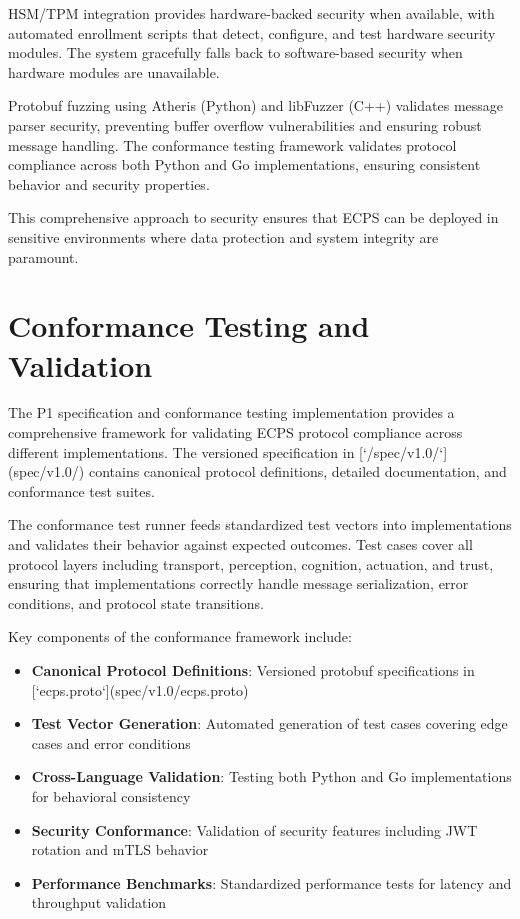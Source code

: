 \documentclass[12pt]{article}
\begin{document}
HSM/TPM integration provides hardware-backed security when available, with automated enrollment scripts that detect, configure, and test hardware security modules. The system gracefully falls back to software-based security when hardware modules are unavailable.

Protobuf fuzzing using Atheris (Python) and libFuzzer (C++) validates message parser security, preventing buffer overflow vulnerabilities and ensuring robust message handling. The conformance testing framework validates protocol compliance across both Python and Go implementations, ensuring consistent behavior and security properties.

This comprehensive approach to security ensures that ECPS can be deployed in sensitive environments where data protection and system integrity are paramount.

\section{Conformance Testing and Validation}
The P1 specification and conformance testing implementation provides a comprehensive framework for validating ECPS protocol compliance across different implementations. The versioned specification in [`/spec/v1.0/`](spec/v1.0/) contains canonical protocol definitions, detailed documentation, and conformance test suites.

The conformance test runner feeds standardized test vectors into implementations and validates their behavior against expected outcomes. Test cases cover all protocol layers including transport, perception, cognition, actuation, and trust, ensuring that implementations correctly handle message serialization, error conditions, and protocol state transitions.

Key components of the conformance framework include:
\begin{itemize}
  \item \textbf{Canonical Protocol Definitions}: Versioned protobuf specifications in [`ecps.proto`](spec/v1.0/ecps.proto)
  \item \textbf{Test Vector Generation}: Automated generation of test cases covering edge cases and error conditions
  \item \textbf{Cross-Language Validation}: Testing both Python and Go implementations for behavioral consistency
  \item \textbf{Security Conformance}: Validation of security features including JWT rotation and mTLS behavior
  \item \textbf{Performance Benchmarks}: Standardized performance tests for latency and throughput validation
\end{itemize}
\end{document}

